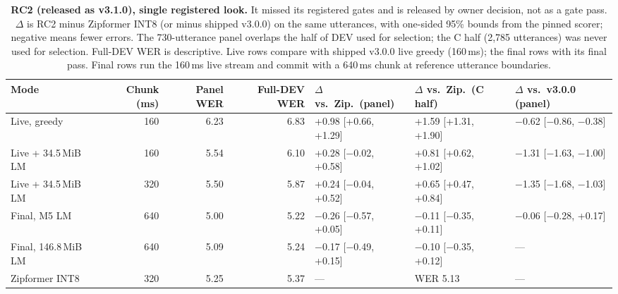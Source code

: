 \begin{table}[t]
\centering
\caption{\textbf{RC2 (released as v3.1.0), single registered look.} It missed its registered gates and is released by owner decision, not as a gate pass. $\Delta$ is RC2 minus Zipformer INT8 (or minus shipped v3.0.0) on the same utterances, with one-sided 95\% bounds from the pinned scorer; negative means fewer errors. The 730-utterance panel overlaps the half of DEV used for selection; the C half (2,785 utterances) was never used for selection. Full-DEV WER is descriptive. Live rows compare with shipped v3.0.0 live greedy (160\,ms); the final rows with its final pass. Final rows run the 160\,ms live stream and commit with a 640\,ms chunk at reference utterance boundaries.}
\label{tab:candidate}
\footnotesize
\setlength{\tabcolsep}{4pt}
\begin{tabular}{@{}lrrrlll@{}}
\toprule
Mode & Chunk (ms) & Panel WER & Full-DEV WER & $\Delta$ vs.\ Zip.\ (panel) & $\Delta$ vs.\ Zip.\ (C half) & $\Delta$ vs.\ v3.0.0 (panel) \\
\midrule
Live, greedy & 160 & 6.23 & 6.83 & +0.98 [+0.66, +1.29] & +1.59 [+1.31, +1.90] & $-$0.62 [$-$0.86, $-$0.38] \\
Live + 34.5\,MiB LM & 160 & 5.54 & 6.10 & +0.28 [$-$0.02, +0.58] & +0.81 [+0.62, +1.02] & $-$1.31 [$-$1.63, $-$1.00] \\
Live + 34.5\,MiB LM & 320 & 5.50 & 5.87 & +0.24 [$-$0.04, +0.52] & +0.65 [+0.47, +0.84] & $-$1.35 [$-$1.68, $-$1.03] \\
Final, M5 LM & 640 & 5.00 & 5.22 & $-$0.26 [$-$0.57, +0.05] & $-$0.11 [$-$0.35, +0.11] & $-$0.06 [$-$0.28, +0.17] \\
Final, 146.8\,MiB LM & 640 & 5.09 & 5.24 & $-$0.17 [$-$0.49, +0.15] & $-$0.10 [$-$0.35, +0.12] & --- \\
\midrule
Zipformer INT8 & 320 & 5.25 & 5.37 & --- & WER 5.13 & --- \\
\bottomrule
\end{tabular}
\end{table}
